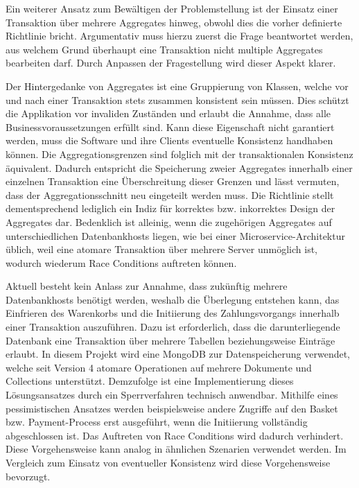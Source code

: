 Ein weiterer Ansatz zum Bewältigen der Problemstellung ist der Einsatz einer Transaktion über mehrere Aggregates hinweg, obwohl dies die vorher definierte Richtlinie bricht. Argumentativ muss hierzu zuerst die Frage beantwortet werden, aus welchem Grund überhaupt eine Transaktion nicht multiple Aggregates bearbeiten darf. Durch Anpassen der Fragestellung wird dieser Aspekt klarer. 

Der Hintergedanke von Aggregates ist eine Gruppierung von Klassen, welche vor und nach einer Transaktion stets zusammen konsistent sein müssen. Dies schützt die Applikation vor invaliden Zuständen und erlaubt die Annahme, dass alle Businessvoraussetzungen erfüllt sind. Kann diese Eigenschaft nicht garantiert werden, muss die Software und ihre Clients eventuelle Konsistenz handhaben können. Die Aggregationsgrenzen sind folglich mit der transaktionalen Konsistenz äquivalent. Dadurch entspricht die Speicherung zweier Aggregates innerhalb einer einzelnen Transaktion eine Überschreitung dieser Grenzen und lässt vermuten, dass der Aggregationsschnitt neu eingeteilt werden muss. Die Richtlinie stellt dementsprechend lediglich ein Indiz für korrektes bzw. inkorrektes Design der Aggregates dar. Bedenklich ist alleinig, wenn die zugehörigen Aggregates auf unterschiedlichen Datenbankhosts liegen, wie bei einer Microservice-Architektur üblich, weil eine atomare Transaktion über mehrere Server unmöglich ist, wodurch wiederum Race Conditions auftreten können.

Aktuell besteht kein Anlass zur Annahme, dass zukünftig mehrere Datenbankhosts benötigt werden, weshalb die Überlegung entstehen kann, das Einfrieren des Warenkorbs und die Initiierung des Zahlungsvorgangs innerhalb einer Transaktion auszuführen. Dazu ist erforderlich, dass die darunterliegende Datenbank eine Transaktion über mehrere Tabellen beziehungsweise Einträge erlaubt. In diesem Projekt wird eine MongoDB zur Datenspeicherung verwendet, welche seit Version 4 atomare Operationen auf mehrere Dokumente und Collections unterstützt. Demzufolge ist eine Implementierung dieses Lösungsansatzes durch ein Sperrverfahren technisch anwendbar. Mithilfe eines pessimistischen Ansatzes werden beispielsweise andere Zugriffe auf den Basket bzw. Payment-Process erst ausgeführt, wenn die Initiierung vollständig abgeschlossen ist. Das Auftreten von Race Conditions wird dadurch verhindert. Diese Vorgehensweise kann analog in ähnlichen Szenarien verwendet werden. Im Vergleich zum Einsatz von eventueller Konsistenz wird diese Vorgehensweise bevorzugt.

